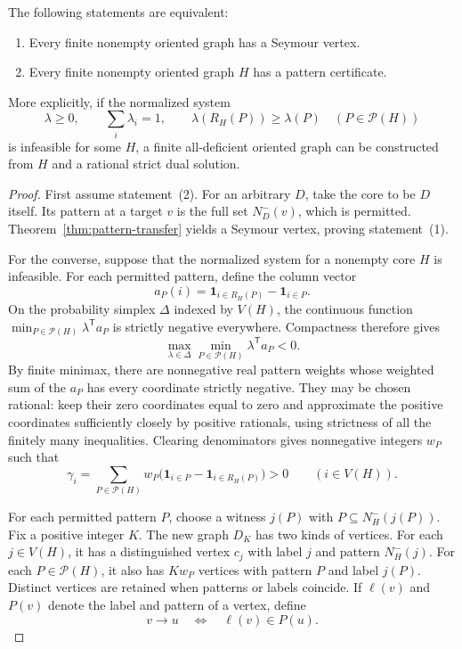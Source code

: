 \begin{theorem}
\label{thm:pattern-duality}
The following statements are equivalent:
\begin{enumerate}
 \item Every finite nonempty oriented graph has a Seymour vertex.
 \item Every finite nonempty oriented graph $H$ has a pattern certificate.
\end{enumerate}
More explicitly, if the normalized system
\[
 \lambda\geq0,\qquad \sum_i\lambda_i=1,\qquad
 \lambda(R_H(P))\geq\lambda(P)\quad(P\in\mathcal P(H))
\]
is infeasible for some $H$, a finite all-deficient oriented graph can be
constructed from $H$ and a rational strict dual solution.
\end{theorem}
\begin{proof}
First assume statement~(2). For an arbitrary $D$, take the core to be
$D$ itself. Its pattern at a target $v$ is the full set $N_D^-(v)$,
which is permitted. Theorem~\ref{thm:pattern-transfer} yields a Seymour
vertex, proving statement~(1).

For the converse, suppose that the normalized system for a nonempty
core $H$ is infeasible. For each permitted pattern, define the column
vector
\[
 a_P(i)=\mathbf1_{i\in R_H(P)}-\mathbf1_{i\in P}.
\]
On the probability simplex $\Delta$ indexed by $V(H)$, the continuous
function $\min_{P\in\mathcal P(H)}\lambda^{\mathsf T}a_P$ is strictly
negative everywhere. Compactness therefore gives
\begin{equation}
 \max_{\lambda\in\Delta}
       \min_{P\in\mathcal P(H)}\lambda^{\mathsf T}a_P<0.
 \label{eq:paper-strict-dual-value}
\end{equation}
By finite minimax, there are nonnegative real pattern weights whose
weighted sum of the $a_P$ has every coordinate strictly negative.
They may be chosen rational: keep their zero coordinates equal to zero
and approximate the positive coordinates sufficiently closely by
positive rationals, using strictness of all the finitely many
inequalities. Clearing denominators gives nonnegative integers $w_P$
such that
\begin{equation}
 \gamma_i=\sum_{P\in\mathcal P(H)}w_P
       \bigl(\mathbf1_{i\in P}-\mathbf1_{i\in R_H(P)}\bigr)>0
       \qquad(i\in V(H)).
 \label{eq:paper-positive-dual-gaps}
\end{equation}

For each permitted pattern $P$, choose a witness $j(P)$ with
$P\subseteq N_H^-(j(P))$. Fix a positive integer $K$. The new graph
$D_K$ has two kinds of vertices. For each $j\in V(H)$, it has a
distinguished vertex $c_j$ with label $j$ and pattern $N_H^-(j)$.
For each $P\in\mathcal P(H)$, it also has $K w_P$ vertices with
pattern $P$ and label $j(P)$. Distinct vertices are retained when
patterns or labels coincide. If $\ell(v)$ and $P(v)$ denote the label
and pattern of a vertex, define
\begin{equation}
 v\to u\quad\Longleftrightarrow\quad \ell(v)\in P(u).
 \label{eq:paper-pattern-realization-arcs}
\end{equation}


\end{proof}
